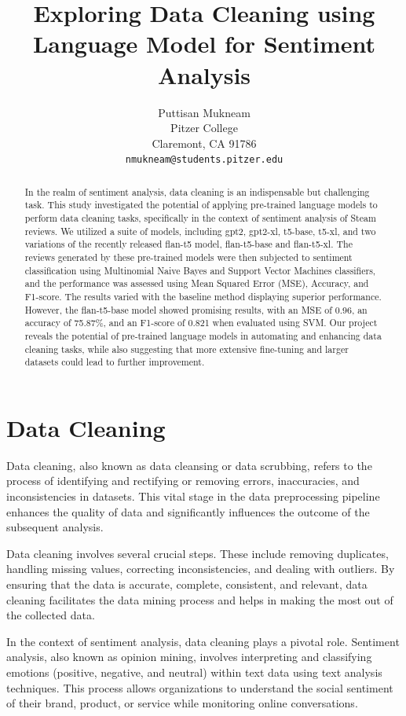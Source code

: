 \documentclass{article}
\title{Exploring Data Cleaning using Language Model for Sentiment Analysis}
\author{
  Puttisan Mukneam \\
  Pitzer College\\
  Claremont, CA 91786 \\
  \texttt{nmukneam@students.pitzer.edu}
}
\begin{document}
\maketitle


\begin{abstract}
In the realm of sentiment analysis, data cleaning is an indispensable but challenging task. This study investigated the potential of applying pre-trained language models to perform data cleaning tasks, specifically in the context of sentiment analysis of Steam reviews. We utilized a suite of models, including gpt2, gpt2-xl, t5-base, t5-xl, and two variations of the recently released flan-t5 model, flan-t5-base and flan-t5-xl. The reviews generated by these pre-trained models were then subjected to sentiment classification using Multinomial Naive Bayes and Support Vector Machines classifiers, and the performance was assessed using Mean Squared Error (MSE), Accuracy, and F1-score. The results varied with the baseline method displaying superior performance. However, the flan-t5-base model showed promising results, with an MSE of 0.96, an accuracy of 75.87\%, and an F1-score of 0.821 when evaluated using SVM. Our project reveals the potential of pre-trained language models in automating and enhancing data cleaning tasks, while also suggesting that more extensive fine-tuning and larger datasets could lead to further improvement.
\end{abstract}

\section{Data Cleaning}
Data cleaning, also known as data cleansing or data scrubbing, refers to the process of identifying and rectifying or removing errors, inaccuracies, and inconsistencies in datasets. This vital stage in the data preprocessing pipeline enhances the quality of data and significantly influences the outcome of the subsequent analysis.

Data cleaning involves several crucial steps. These include removing duplicates, handling missing values, correcting inconsistencies, and dealing with outliers. By ensuring that the data is accurate, complete, consistent, and relevant, data cleaning facilitates the data mining process and helps in making the most out of the collected data.

In the context of sentiment analysis, data cleaning plays a pivotal role. Sentiment analysis, also known as opinion mining, involves interpreting and classifying emotions (positive, negative, and neutral) within text data using text analysis techniques. This process allows organizations to understand the social sentiment of their brand, product, or service while monitoring online conversations.
\end{document}
